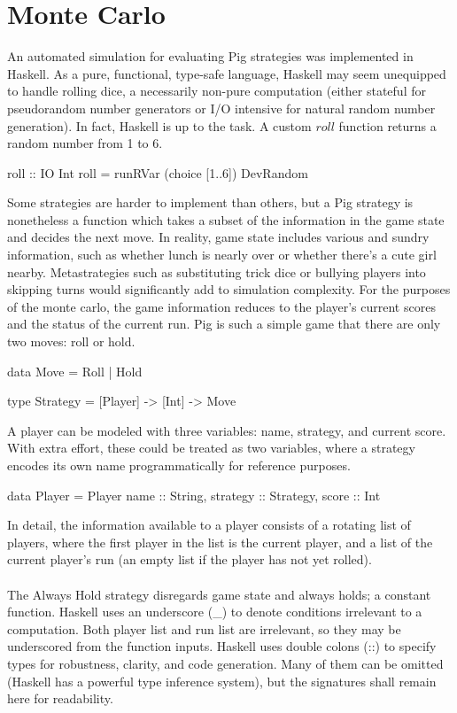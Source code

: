 \documentclass{article}
\begin{document}
\section*{Monte Carlo}
An automated simulation for evaluating Pig strategies was implemented in Haskell. As a pure, functional, type-safe language, Haskell may seem unequipped to handle rolling dice, a necessarily non-pure computation (either stateful for pseudorandom number generators or I/O intensive for natural random number generation). In fact, Haskell is up to the task. A custom $roll$ function returns a random number from 1 to 6.
\begin{verbatimtab}
roll :: IO Int
roll = runRVar (choice [1..6]) DevRandom
\end{verbatimtab}
Some strategies are harder to implement than others, but a Pig strategy is nonetheless a function which takes a subset of the information in the game state and decides the next move. In reality, game state includes various and sundry information, such as whether lunch is nearly over or whether there's a cute girl nearby. Metastrategies such as substituting trick dice or bullying players into skipping turns would significantly add to simulation complexity. For the purposes of the monte carlo, the game information reduces to the player's current scores and the status of the current run. Pig is such a simple game that there are only two moves: roll or hold.
\begin{verbatimtab}
data Move = Roll | Hold

type Strategy = [Player] -> [Int] -> Move
\end{verbatimtab}
A player can be modeled with three variables: name, strategy, and current score. With extra effort, these could be treated as two variables, where a strategy encodes its own name programmatically for reference purposes.
\begin{verbatimtab}
data Player = Player {
  name :: String,
  strategy :: Strategy,
  score :: Int
  }
\end{verbatimtab}
In detail, the information available to a player consists of a rotating list of players, where the first player in the list is the current player, and a list of the current player's run (an empty list if the player has not yet rolled).
\\\\
The Always Hold strategy disregards game state and always holds; a constant function. Haskell uses an underscore (\_) to denote conditions irrelevant to a computation. Both player list and run list are irrelevant, so they may be underscored from the function inputs. Haskell uses double colons (::) to specify types for robustness, clarity, and code generation. Many of them can be omitted (Haskell has a powerful type inference system), but the signatures shall remain here for readability.
\end{document}
